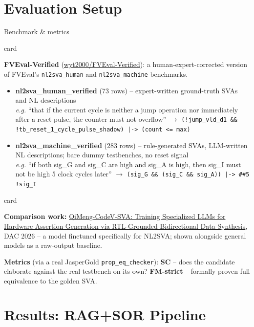 \documentclass[aspectratio=169]{beamer}
\newenvironment{card}[1][\textwidth]{%
  \begin{beamercolorbox}[wd=#1,sep=8pt,rounded=true,shadow=false]{card}
}{%
  \end{beamercolorbox}
}
\begin{document}
\section{Evaluation Setup}

\begin{frame}{Benchmark \& metrics}
  \footnotesize
  \begin{card}
  \footnotesize
  \textbf{FVEval-Verified} (\href{https://huggingface.co/wyt2000}{wyt2000/FVEval-Verified}):
  a human-expert-corrected version of FVEval's \texttt{nl2sva\_human} and
  \texttt{nl2sva\_machine} benchmarks.
  \begin{itemize}
    \item \textbf{nl2sva\_human\_verified} (73 rows) -- expert-written
      ground-truth SVAs and NL descriptions\\
      {\tiny\textit{e.g.} ``that if the current cycle is neither a jump
      operation nor immediately after a reset pulse, the counter must not
      overflow'' $\rightarrow$ \texttt{(!jump\_vld\_d1 \&\& !tb\_reset\_1\_cycle\_pulse\_shadow)
      |-> (count <= max)}}
    \item \textbf{nl2sva\_machine\_verified} (283 rows) -- rule-generated
      SVAs, LLM-written NL descriptions; bare dummy testbenches, no reset
      signal\\
      {\tiny\textit{e.g.} ``if both sig\_G and sig\_C are high and sig\_A is
      high, then sig\_I must not be high 5 clock cycles later'' $\rightarrow$
      \texttt{(sig\_G \&\& (sig\_C \&\& sig\_A)) |-> \#\#5 !sig\_I}}
  \end{itemize}
  \end{card}
  \vspace{3pt}
  \begin{card}
  \scriptsize
  \textbf{Comparison work:} \href{https://arxiv.org/abs/2603.14239}{QiMeng-CodeV-SVA:
  Training Specialized LLMs for Hardware Assertion Generation via
  RTL-Grounded Bidirectional Data Synthesis}, DAC 2026 -- a model
  finetuned specifically for NL2SVA; shown alongside general models as a
  raw-output baseline.
  \end{card}
  \vspace{2pt}
  \footnotesize
  \textbf{Metrics} (via a real JasperGold \texttt{prop\_eq\_checker}):
  \textbf{SC} -- does the candidate elaborate against the real testbench
  on its own? \textbf{FM-strict} -- formally proven full equivalence to
  the golden SVA.
\end{frame}

\section{Results: RAG+SOR Pipeline}
\end{document}
